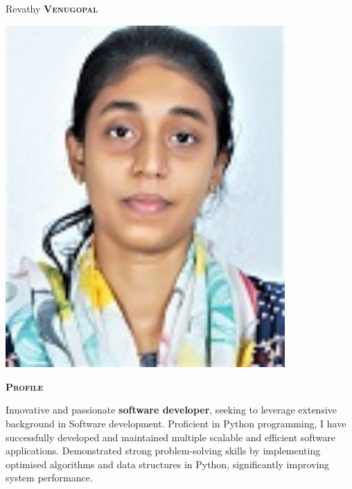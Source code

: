 \documentclass[11pt, a4paper]{article}
\newcommand{\headleft}[1]{\vspace*{3ex}\textsc{\textbf{#1}}\par%
    \vspace*{-1.5ex}\hrulefill\par\vspace*{0.7ex}}
\begin{document}
\setlength{\topskip}{0pt}
\setlength{\parindent}{0pt}
\setlength{\parskip}{0pt}
\setlength{\fboxsep}{0pt}
\pagestyle{empty}
\raggedbottom

\begin{minipage}[t]{0.33\textwidth} %
\colorbox{cvblue}{\begin{minipage}[t][5mm][t]{\textwidth}\null\hfill\null\end{minipage}}

\vspace{-.2ex} %
\colorbox{cvblue!90}{\color{white}  %
\textwidth\relax%
\begin{minipage}[t][293mm][t]{0.82\textwidth}
\raggedright
\vspace*{2.5ex}

\Large Revathy \textbf{\textsc{Venugopal}} \normalsize 

\null\hfill\includegraphics[width=0.80\textwidth]{../assets/revathy.jpg}\hfill\null

\vspace*{0.5ex} %

\headleft{Profile}
Innovative and passionate \textbf{software developer}, seeking to leverage extensive background in Software development.
Proficient in Python programming, I have successfully developed and maintained multiple scalable and efficient software applications.
Demonstrated strong problem-solving skills by implementing optimised algorithms and data structures in Python, significantly improving system performance.


\end{minipage}}
\end{minipage}
\end{document}
